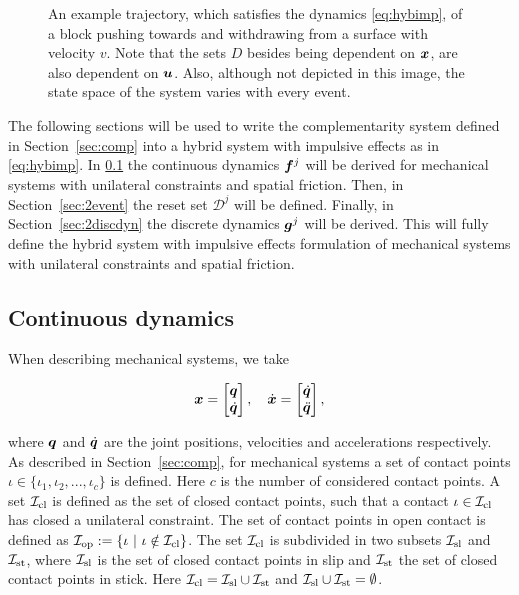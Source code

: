 \documentclass[../DC2017114Bouma.tex]{subfiles}
\begin{document}
\begin{figure}[h]
\begin{subfigure}[b]{\textwidth}
\label{fig:2exampletraj}
\end{subfigure}
\caption{An example trajectory, which satisfies the dynamics \eqref{eq:hybimp}, of a block pushing towards and withdrawing from a surface with velocity $v$.  Note that the sets $D$ besides being dependent on ${\boldsymbol{x}}$, are also dependent on ${\boldsymbol{u}}$. Also, although not depicted in this image, the state space of the system varies with every event.}
\label{fig:2example}
\end{figure}

The following sections will be used to write the complementarity system defined in Section~\ref{sec:comp} into a hybrid system with impulsive effects as in \eqref{eq:hybimp}. In \ref{sec:2contdyn} the continuous dynamics ${\boldsymbol{f}}^j$ will be derived for mechanical systems with unilateral constraints and spatial friction. Then, in Section~\ref{sec:2event} the reset set $\mathcal{D}^j$ will be defined. Finally, in Section~\ref{sec:2discdyn} the discrete dynamics ${\boldsymbol{g}}^j$ will be derived. This will fully define the hybrid system with impulsive effects formulation of mechanical systems with unilateral constraints and spatial friction.

\subsection{Continuous dynamics}\label{sec:2contdyn}
When describing mechanical systems, we take 

\begin{align}
{\boldsymbol{x}} = \begin{bmatrix}
{\boldsymbol{q}}\\ \dot{{\boldsymbol{q}}}
\end{bmatrix},\quad
\dot{{\boldsymbol{x}}} = \begin{bmatrix}
\dot{{\boldsymbol{q}}}\\ \ddot{{\boldsymbol{q}}}
\end{bmatrix},
\end{align}

where ${\boldsymbol{q}}$ and $\dot{{\boldsymbol{q}}}$ are the joint positions, velocities and accelerations respectively. As described in Section~\ref{sec:comp}, for mechanical systems a set of contact points $\iota\in\{\iota_1,\iota_2,...,\iota_c\}$ is defined. Here $c$ is the number of considered contact points. A set $\mathcal{I}_{\text{cl}}$ is defined as the set of closed contact points, such that a contact $\iota\in\mathcal{I}_{\text{cl}}$ has closed a unilateral constraint. The set of contact points in open contact is defined as $\Ic_{\text{op}} := \{\iota\ |\ \iota\notin\Ic_{\text{cl}}\}$. The set $\mathcal{I}_{\text{cl}}$ is subdivided in two subsets $\mathcal{I}_{\text{sl}}$ and $\mathcal{I}_{\text{st}}$, where $\mathcal{I}_{\text{sl}}$ is the set of closed contact points in slip and $\mathcal{I}_{\text{st}}$ the set of closed contact points in stick. Here $\mathcal{I}_{\text{cl}} =\mathcal{I}_{\text{sl}}\cup\mathcal{I}_{\text{st}}$ and $\mathcal{I}_{\text{sl}}\cup\mathcal{I}_{\text{st}}=\emptyset$. 
\end{document}
